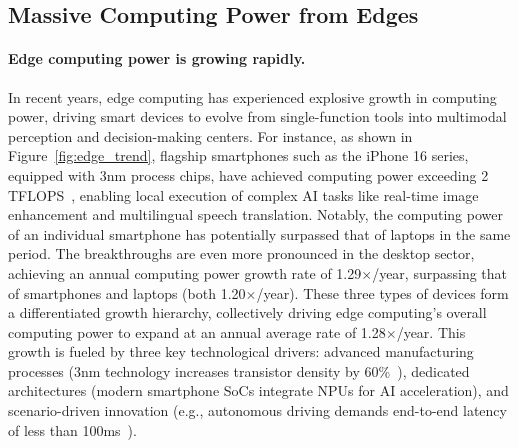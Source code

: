 \subsection{Massive Computing Power from Edges}\label{subsec:edge_compute}



\paragraph{Edge computing power is growing rapidly.}
In recent years, edge computing has experienced explosive growth in computing power, driving smart devices to evolve from single-function tools into multimodal perception and decision-making centers. For instance, as shown in Figure~\ref{fig:edge_trend}, flagship smartphones such as the iPhone 16 series, equipped with 3nm process chips, have achieved computing power exceeding 2 TFLOPS~\cite{apple2024iphone16pro}, enabling local execution of complex AI tasks like real-time image enhancement and multilingual speech translation. 
Notably, the computing power of an individual smartphone has potentially surpassed that of laptops in the same period.
The breakthroughs are even more pronounced in the desktop sector,
achieving an annual computing power growth rate of 1.29$\times$/year, surpassing that of smartphones and laptops (both 1.20$\times$/year). 
These three types of devices form a differentiated growth hierarchy, collectively driving edge computing's overall computing power to expand at an annual average rate of 1.28$\times$/year.
This growth is fueled by three key technological drivers: advanced manufacturing processes (3nm technology increases transistor density by 60\%~\cite{apple2024iphone16pro}), dedicated architectures (modern smartphone SoCs integrate NPUs for AI acceleration), and scenario-driven innovation (e.g., autonomous driving demands end-to-end latency of less than 100ms~\cite{nvidia2023}).
